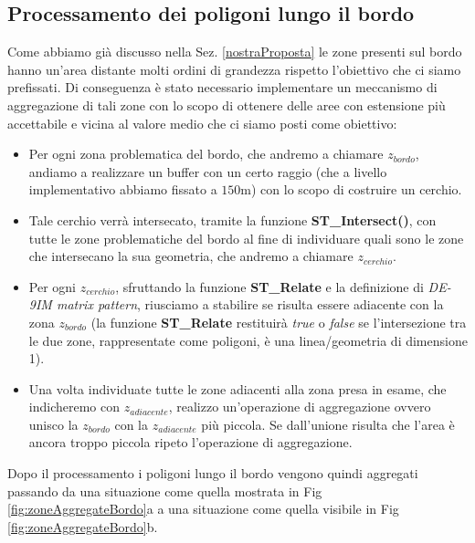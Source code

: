 \subsection{Processamento dei poligoni lungo il bordo}
Come abbiamo già discusso nella Sez. \ref{nostraProposta} le zone presenti sul bordo hanno un'area distante molti ordini di grandezza rispetto l'obiettivo che ci siamo prefissati. Di conseguenza è stato necessario implementare un meccanismo di aggregazione di tali zone con lo scopo di ottenere delle aree con estensione più accettabile e vicina al valore medio che ci siamo posti come obiettivo: \newline
\begin{itemize}
\item Per ogni zona problematica del bordo, che andremo a chiamare $z_{bordo}$, andiamo a realizzare un buffer con un certo raggio (che a livello implementativo abbiamo fissato a $150$m) con lo scopo di costruire un cerchio.
\item Tale cerchio verrà intersecato, tramite la funzione \textbf{ST\_Intersect()}, con tutte le zone problematiche del bordo al fine di individuare quali sono le zone che intersecano la sua geometria, che andremo a chiamare $z_{cerchio}$.
\item Per ogni $z_{cerchio}$, sfruttando la funzione \textbf{ST\_Relate} e la definizione di \textit{DE-9IM matrix pattern}, riusciamo a stabilire se risulta essere adiacente con la zona $z_{bordo}$ (la funzione \textbf{ST\_Relate} restituirà \textit{true} o \textit{false} se l'intersezione tra le due zone, rappresentate come poligoni, è una linea/geometria di dimensione 1).
\item Una volta individuate tutte le zone adiacenti alla zona presa in esame, che indicheremo con $z_{adiacente}$, realizzo un'operazione di aggregazione ovvero unisco la $z_{bordo}$ con la $z_{adiacente}$ più piccola. Se dall'unione risulta che l'area è ancora troppo piccola ripeto l'operazione di aggregazione.
\end{itemize}
Dopo il processamento i poligoni lungo il bordo vengono quindi aggregati passando da una situazione come quella mostrata in Fig \ref{fig:zoneAggregateBordo}a a una situazione come quella visibile in Fig \ref{fig:zoneAggregateBordo}b.

